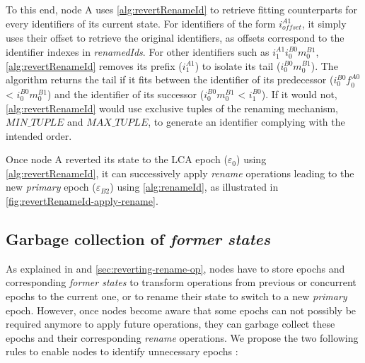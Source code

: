 \documentclass[sigplan,10pt]{acmart}
\newcommand{\trm}[1]{\mathit{#1}}
\newcommand{\id}[3]{$\trm{#1}^{\trm{#2}}_{\trm{#3}}$}
\newcommand{\epoch}[1]{$\varepsilon_{#1}$}
\begin{document}
To this end, node A uses \autoref{alg:revertRenameId} to retrieve fitting counterparts for every identifiers of its current state.
For identifiers of the form \id{i}{A1}{offset}, it simply uses their offset to retrieve the original identifiers, as offsets correspond to the identifier indexes in \emph{renamedIds}.
For other identifiers such as \id{i}{A1}{1}\id{i}{B0}{0}\id{m}{B1}{0}, \autoref{alg:revertRenameId} removes its prefix (\id{i}{A1}{1}) to isolate its tail (\id{i}{B0}{0}\id{m}{B1}{0}).
The algorithm returns the tail if it fits between the identifier of its predecessor (\id{i}{B0}{0}\id{f}{A0}{0} < \id{i}{B0}{0}\id{m}{B1}{0}) and the identifier of its successor (\id{i}{B0}{0}\id{m}{B1}{0} < \id{i}{B0}{1}).
If it would not, \autoref{alg:revertRenameId} would use exclusive tuples of the renaming mechanism, $\trm{MIN\_TUPLE}$ and $\trm{MAX\_TUPLE}$, to generate an identifier complying with the intended order.

Once node A reverted its state to the LCA epoch (\epoch{0}) using \autoref{alg:revertRenameId}, it can successively apply \emph{rename} operations leading to the new \emph{primary} epoch (\epoch{B2}) using \autoref{alg:renameId}, as illustrated in \autoref{fig:revertRenameId-apply-rename}.

\subsection{Garbage collection of \emph{former states}}


As explained in \cite{nicolas:hal-02526724} and \autoref{sec:reverting-rename-op}, nodes have to store epochs and corresponding \emph{former states} to transform operations from previous or concurrent epochs to the current one, or to rename their state to switch to a new \emph{primary} epoch.
However, once nodes become aware that some epochs can not possibly be required anymore to apply future operations, they can garbage collect these epochs and their corresponding \emph{rename} operations.
We propose the two following rules to enable nodes to identify unnecessary epochs :
\end{document}
